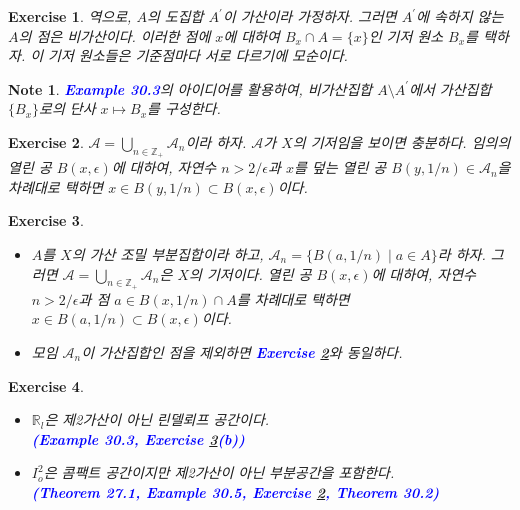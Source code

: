 \documentclass{article}
\newtheorem{exercise}{Exercise}[section]
\newtheorem*{note}{Note}
\newcommand{\R}{\mathbb{R}}
\newcommand{\Z}{\mathbb{Z}}
\begin{document}
\begin{exercise}
	\label{exc:30.3}
    역으로, $A$의 도집합 $A^\prime$이 가산이라 가정하자. 그러면 $A^\prime$에 속하지 않는 $A$의 점은 비가산이다. 이러한 점에 $x$에 대하여 $B_x\cap A=\{x\}$인 기저 원소 $B_x$를 택하자. 이 기저 원소들은 기준점마다 서로 다르기에 모순이다.
\end{exercise}
\begin{note}
    \textcolor{blue}{\textbf{Example 30.3}}의 아이디어를 활용하여, 비가산집합 $A\setminus A^{\prime}$에서 가산집합 $\{B_x\}$로의 단사 $x\mapsto B_x$를 구성한다.
\end{note}

\begin{exercise}
	\label{exc:30.4}
    $\mathcal{A}=\bigcup_{n\in\Z_+}\mathcal{A}_n$이라 하자. $\mathcal{A}$가 $X$의 기저임을 보이면 충분하다. 임의의 열린 공 $B(x,\epsilon)$에 대하여, 자연수 $n>2/\epsilon$과 $x$를 덮는 열린 공 $B(y,1/n)\in\mathcal{A}_n$을 차례대로 택하면 $x\in B(y,1/n)\subset B(x,\epsilon)$이다.
\end{exercise}

\begin{exercise}
	\label{exc:30.5}
    \phantom{}
    \begin{itemize}
        \item[(a)] $A$를 $X$의 가산 조밀 부분집합이라 하고, $\mathcal{A}_n=\{B(a,1/n)\mid a\in A\}$라 하자. 그러면 $\mathcal{A}=\bigcup_{n\in\Z_+}\mathcal{A}_n$은 $X$의 기저이다. 열린 공 $B(x,\epsilon)$에 대하여, 자연수 $n>2/\epsilon$과 점 $a\in B(x,1/n)\cap A$를 차례대로 택하면 $x\in B(a,1/n)\subset B(x,\epsilon)$이다.
        \item[(b)] 모임 $\mathcal{A}_n$이 가산집합인 점을 제외하면 \textcolor{blue}{\textbf{Exercise \ref{exc:30.4}}}와 동일하다.
    \end{itemize}
\end{exercise}

\begin{exercise}
    \phantom{}
    \begin{itemize}
        \item $\R_l$은 제2가산이 아닌 린델뢰프 공간이다. \\ \textcolor{blue}{\textbf{(Example 30.3, Exercise \ref{exc:30.5}(b))}}
        \item $I_o^2$은 콤팩트 공간이지만 제2가산이 아닌 부분공간을 포함한다. \\ \textcolor{blue}{\textbf{(Theorem 27.1, Example 30.5, Exercise \ref{exc:30.4}, Theorem 30.2)}}
    \end{itemize}
\end{exercise}
\end{document}
